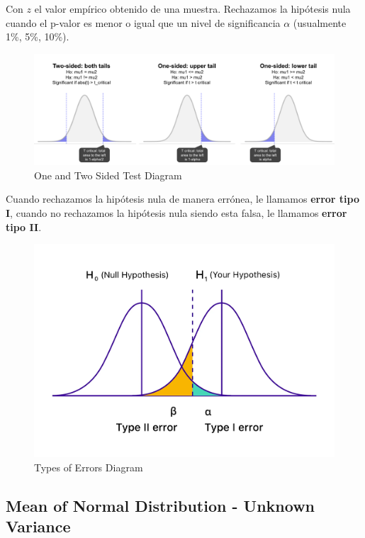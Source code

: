 Con $z$ el valor empírico obtenido de una muestra. Rechazamos la hipótesis nula cuando el p-valor es menor o igual que un nivel de significancia $\alpha$ (usualmente 1\%, 5\%, 10\%).

\begin{figure}[H]
    \center
    \includegraphics[scale=0.65]{notebooks/STATS/img/two_sided_test.png}
    \caption{One and Two Sided Test Diagram}
\end{figure}


Cuando rechazamos la hipótesis nula de manera errónea, le llamamos \textbf{error tipo I}, cuando no rechazamos la hipótesis nula siendo esta falsa, le llamamos \textbf{error tipo II}.

\begin{figure}[H]
    \center
    \includegraphics[scale=0.2]{notebooks/STATS/img/type_of_errors.png}
    \caption{Types of Errors Diagram}
\end{figure}

\subsection{Mean of Normal Distribution - Unknown Variance}

